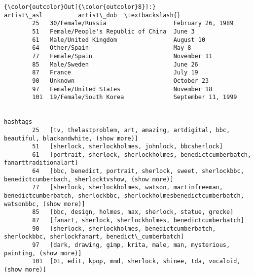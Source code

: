 \documentclass[11pt]{article}
\begin{document}
\begin{Verbatim}[commandchars=\\\{\}]
{\color{outcolor}Out[{\color{outcolor}8}]:}                             artist\_asl          artist\_dob  \textbackslash{}
        25   30/Female/Russia                   February 26, 1989    
        51   Female/People's Republic of China  June 3               
        61   Male/United Kingdom                August 10            
        64   Other/Spain                        May 8                
        77   Female/Spain                       November 11          
        85   Male/Sweden                        June 26              
        87   France                             July 19              
        90   Unknown                            October 23           
        97   Female/United States               November 18          
        101  19/Female/South Korea              September 11, 1999   
        
                                                                                                                                                   hashtags  
        25   [tv, thelastproblem, art, amazing, artdigital, bbc, beautiful, blackandwhite, (show more)]                                                      
        51   [sherlock, sherlockholmes, johnlock, bbcsherlock]                                                                                               
        61   [portrait, sherlock, sherlockholmes, benedictcumberbatch, fanarttraditionalart]                                                                 
        64   [bbc, benedict, portrait, sherlock, sweet, sherlockbbc, benedictcumberbach, sherlocktvshow, (show more)]                                        
        77   [sherlock, sherlockholmes, watson, martinfreeman, benedictcumberbatch, sherlockbbc, sherlockholmesbenedictcumberbatch, watsonbbc, (show more)]  
        85   [bbc, design, holmes, max, sherlock, statue, grecke]                                                                                            
        87   [fanart, sherlock, sherlockholmes, benedictcumberbatch]                                                                                         
        90   [sherlock, sherlockholmes, benedictcumberbatch, sherlockbbc, sherlockfanart, benedict\_cumberbatch]                                              
        97   [dark, drawing, gimp, krita, male, man, mysterious, painting, (show more)]                                                                      
        101  [01, edit, kpop, mmd, sherlock, shinee, tda, vocaloid, (show more)]                                                                             
\end{Verbatim}
            \newpage
\end{document}
